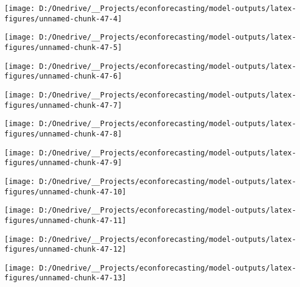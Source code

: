 \documentclass[11pt, letterpaper]{article}\usepackage[]{graphicx}\usepackage[]{color}
\begin{document}
{\centering \texttt{[image: D:/Onedrive/\_\_Projects/econforecasting/model-outputs/latex-figures/unnamed-chunk-47-4]} 

}




{\centering \texttt{[image: D:/Onedrive/\_\_Projects/econforecasting/model-outputs/latex-figures/unnamed-chunk-47-5]} 

}




{\centering \texttt{[image: D:/Onedrive/\_\_Projects/econforecasting/model-outputs/latex-figures/unnamed-chunk-47-6]} 

}




{\centering \texttt{[image: D:/Onedrive/\_\_Projects/econforecasting/model-outputs/latex-figures/unnamed-chunk-47-7]} 

}




{\centering \texttt{[image: D:/Onedrive/\_\_Projects/econforecasting/model-outputs/latex-figures/unnamed-chunk-47-8]} 

}




{\centering \texttt{[image: D:/Onedrive/\_\_Projects/econforecasting/model-outputs/latex-figures/unnamed-chunk-47-9]} 

}




{\centering \texttt{[image: D:/Onedrive/\_\_Projects/econforecasting/model-outputs/latex-figures/unnamed-chunk-47-10]} 

}




{\centering \texttt{[image: D:/Onedrive/\_\_Projects/econforecasting/model-outputs/latex-figures/unnamed-chunk-47-11]} 

}




{\centering \texttt{[image: D:/Onedrive/\_\_Projects/econforecasting/model-outputs/latex-figures/unnamed-chunk-47-12]} 

}




{\centering \texttt{[image: D:/Onedrive/\_\_Projects/econforecasting/model-outputs/latex-figures/unnamed-chunk-47-13]} 

}
\end{document}
